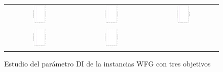 \begin{figure}[h]
\centering
\caption{Estudio del parámetro DI de la instancias WFG con tres objetivos}
\label{fig:Scalability_Study_HV_1}
\begin{tabular}{ccc}
   \includegraphics[width=0.2\textwidth, angle=-90,origin=c]{Figures_Chapter7/Results_Chapter3/EPS_DI/3obj_WFG1.eps} &
   \includegraphics[width=0.2\textwidth, angle=-90,origin=c]{Figures_Chapter7/Results_Chapter3/EPS_DI/3obj_WFG2.eps} &
   \includegraphics[width=0.2\textwidth,angle=-90,origin=c]{Figures_Chapter7/Results_Chapter3/EPS_DI/3obj_WFG3.eps}  
    \\ 
   \includegraphics[width=0.2\textwidth, angle=-90,origin=c]{Figures_Chapter7/Results_Chapter3/EPS_DI/3obj_WFG4.eps} &
   \includegraphics[width=0.2\textwidth, angle=-90,origin=c]{Figures_Chapter7/Results_Chapter3/EPS_DI/3obj_WFG5.eps} &

\end{tabular}
\end{figure}

